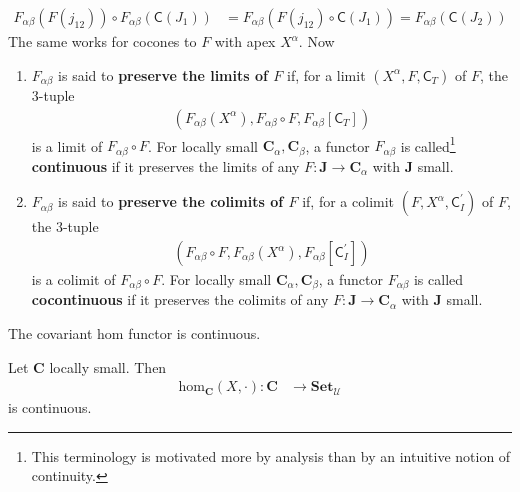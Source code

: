 \begin{align*}
  F_{\alpha\beta}(F(j_{12}))
  \circ
  F_{\alpha\beta}(\mathsf{C}(J_{1}))
  &=
  F_{\alpha\beta}
  \left(
    F(j_{12})
    \circ
    \mathsf{C}(J_{1})
  \right)
  =
  F_{\alpha\beta}(\mathsf{C}(J_{2}))
\end{align*}
The same works for cocones to $F$ with apex $X^{\alpha}$.
Now
\begin{enumerate}
\item[(1T)]
$F_{\alpha\beta}$ is said to \textbf{preserve the limits of $F$} if, for a limit $(X^{\alpha},F,\mathsf{C}_{T})$ of $F$, the $3$-tuple
\begin{align*}
  \left(
    F_{\alpha\beta}(X^{\alpha}),
    F_{\alpha\beta} \circ F,
    F_{\alpha\beta}[\mathsf{C}_{T}]
  \right)
\end{align*}
is a limit of $F_{\alpha\beta} \circ F$.
For locally small $\mathbf{C}_{\alpha},\mathbf{C}_{\beta}$, a functor $F_{\alpha\beta}$ is called\footnote{This terminology is motivated more by analysis than by an intuitive notion of continuity.} \textbf{continuous} if it preserves the limits of any $F \colon \mathbf{J} \rightarrow \mathbf{C}_{\alpha}$ with $\mathbf{J}$ small.
\item[(1I)]
$F_{\alpha\beta}$ is said to \textbf{preserve the colimits of $F$} if, for a colimit $(F,X^{\alpha},\mathsf{C}_{I}^{\prime})$ of $F$, the $3$-tuple
\begin{align*}
  \left(
    F_{\alpha\beta} \circ F,
    F_{\alpha\beta}(X^{\alpha}),
    F_{\alpha\beta}[\mathsf{C}_{I}^{\prime}]
  \right)
\end{align*}
is a colimit of $F_{\alpha\beta} \circ F$.
For locally small $\mathbf{C}_{\alpha},\mathbf{C}_{\beta}$, a functor $F_{\alpha\beta}$ is called \textbf{cocontinuous} if it preserves the colimits of any $F \colon \mathbf{J} \rightarrow \mathbf{C}_{\alpha}$ with $\mathbf{J}$ small.
\end{enumerate}
The covariant hom functor is continuous.
\\
\begin{thm}
\label{thm:cohomiscont}
Let $\mathbf{C}$ locally small.
Then
\begin{align*}
  \mathrm{hom}_{\mathbf{C}}(X,\cdot)
  \colon
  \mathbf{C}
  &\rightarrow
  \mathbf{Set}_{\mathcal{U}}
\end{align*}
is continuous.
\end{thm}
